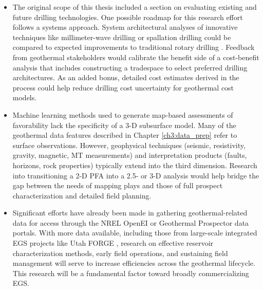 \begin{itemize}
    \item The original scope of this thesis included a section on evaluating existing and future drilling technologies. One possible roadmap for this research effort follows a systems approach. System architectural analyses of innovative techniques like millimeter-wave drilling \citep{woskov_millimeter-wave_2017} or spallation drilling \cite{augustine_hydrothermal_2009} could be compared to expected improvements to traditional rotary drilling \citep{lowry_geovision_2017}. Feedback from geothermal stakeholders would calibrate the benefit side of a cost-benefit analysis that includes constructing a tradespace to select preferred drilling architectures. As an added bonus, detailed cost estimates derived in the process could help reduce drilling cost uncertainty for geothermal cost models.
    \item Machine learning methods used to generate map-based assessments of favorability lack the specificity of a 3-D subsurface model. Many of the geothermal data features described in Chapter \ref{ch3:data_prep} refer to surface observations. However, geophysical techniques (seismic, resistivity, gravity, magnetic, MT measurements) and interpretation products (faults, horizons, rock properties) typically extend into the third dimension. Research into transitioning a 2-D PFA into a 2.5- or 3-D analysis would help bridge the gap between the needs of mapping plays and those of full prospect characterization and detailed field planning.
    \item Significant efforts have already been made in gathering geothermal-related data for access through the NREL OpenEI \citep{hallett_open_2010} or Geothermal Prospector \citep{nrel_geothermal_2021} data portals. With more data available, including those from large-scale integrated EGS projects like Utah FORGE \citep{moore_utah_2019}, research on effective reservoir characterization methods, early field operations, and sustaining field management will serve to increase efficiencies across the geothermal lifecycle. This research will be a fundamental factor toward broadly commercializing EGS.
\end{itemize}